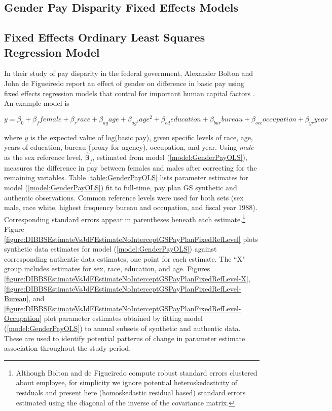 \documentclass[10pt, letterpaper]{article}
\newcommand{\mest}[1]{\hat{\bm{#1}}}
\begin{document}
\begin{spacing}{1.0}
\clearpage

\section{Gender Pay Disparity Fixed Effects Models}

\subsection{Fixed Effects Ordinary Least Squares Regression Model}

In their study of pay disparity in the federal government, Alexander Bolton and John de Figueiredo report an effect of gender on difference in basic pay using fixed effects regression models that control for important human capital factors \citep{BoltondeFigGenderPayGap2017}.  An example model is

\vspace{-10pt}
\begin{equation} y=\beta_0+\beta_ffemale+\beta_rrace+\beta_{ag}age+\beta_{ag^2}age^2+\beta_{ed}education+\beta_{bur}bureau+\beta_{occ}occupation+\beta_{yr}year
\label{model:GenderPayOLS}
\end{equation}

where $y$ is the expected value of log(basic pay), given specific levels of race, age, years of education, bureau (proxy for agency), occupation, and year.  Using \textit{male} as the sex reference level, $\mest{\beta}_f$, estimated from model (\ref{model:GenderPayOLS}), measures the difference in pay between females and males after correcting for the remaining variables.  Table \ref{table:GenderPayOLS} lists parameter estimates for model (\ref{model:GenderPayOLS}) fit to full-time, pay plan GS synthetic and authentic observations.  Common reference levels were used for both sets (sex male, race white, highest frequency bureau and occupation, and fiscal year 1988).  Corresponding standard errors appear in parentheses beneath each estimate.\footnote{Although Bolton and de Figueiredo compute robust standard errors clustered about employee, for simplicity we ignore potential heteroskedasticity of residuals and present here (homoskedastic residual based) standard errors estimated using the diagonal of the inverse of the covariance matrix.}  Figure \ref{figure:DIBBSEstimateVsJdFEstimateNoInterceptGSPayPlanFixedRefLevel} plots 
synthetic data estimates for model (\ref{model:GenderPayOLS}) against corresponding authentic data estimates, one point for each estimate.  The ``X" group includes estimates for sex, race, education, and age.  Figures \ref{figure:DIBBSEstimateVsJdFEstimateNoInterceptGSPayPlanFixedRefLevel-X}, \ref{figure:DIBBSEstimateVsJdFEstimateNoInterceptGSPayPlanFixedRefLevel-Bureau}, and \ref{figure:DIBBSEstimateVsJdFEstimateNoInterceptGSPayPlanFixedRefLevel-Occupation} plot parameter estimates obtained by fitting model (\ref{model:GenderPayOLS}) to annual subsets of synthetic and authentic data.  These are used to identify potential patterns of change in parameter estimate association throughout the study period.\\


\end{spacing}
\end{document}
